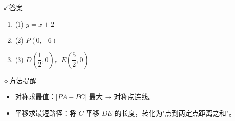 \documentclass{exam-zh}
\newcommand{\eduIconCheck}{\(\checkmark\)}
\newcommand{\eduIconPin}{\(\diamond\)}
\newenvironment{eduBulletList}{%
  \begin{itemize}[
    label=\textbullet,
    leftmargin=5mm,
    itemsep=1.2mm,
    topsep=0pt,
    parsep=0pt
  ]
}{%
  \end{itemize}
}
\newenvironment{eduBottomGrid}{%
  \vspace{1mm}
  \par\noindent
}{%
  \par\vspace{1mm}
}
\newenvironment{eduSummaryLeft}{%
  \begin{minipage}[t]{0.30\linewidth}
}{%
  \end{minipage}
}
\newcommand{\eduSummaryDivider}{%
  \hspace{4mm}{\color{edu-line}\vrule width 0.35pt}\hspace{7mm}%
}
\newenvironment{eduSummaryRight}{%
  \begin{minipage}[t]{0.58\linewidth}
}{%
  \end{minipage}
}
\newenvironment{eduPlainList}{%
  \begin{enumerate}[
    label=(\arabic*),
    leftmargin=7mm,
    itemsep=1.2mm,
    topsep=0pt,
    parsep=0pt
  ]
}{%
  \end{enumerate}
}
\begin{document}
\begin{eduBottomGrid}
  \begin{eduSummaryLeft}
    \begin{eduSummaryBlock}{\eduIconCheck}{答案}
    \begin{eduPlainList}
      \item (1) $y = x + 2$      \item (2) $P(0, -6)$      \item (3) $D\left(\dfrac{1}{2}, 0\right)$，$E\left(\dfrac{5}{2}, 0\right)$    \end{eduPlainList}
    \end{eduSummaryBlock}
  \end{eduSummaryLeft}
  \eduSummaryDivider
  \begin{eduSummaryRight}
    \begin{eduSummaryBlock}{\eduIconPin}{方法提醒}
    \begin{eduBulletList}
      \item 对称求最值：$|PA-PC|$ 最大 → 对称点连线。      \item 平移求最短路径：将 $C$ 平移 $DE$ 的长度，转化为"点到两定点距离之和"。    \end{eduBulletList}
    \end{eduSummaryBlock}
  \end{eduSummaryRight}
\end{eduBottomGrid}
\end{document}
